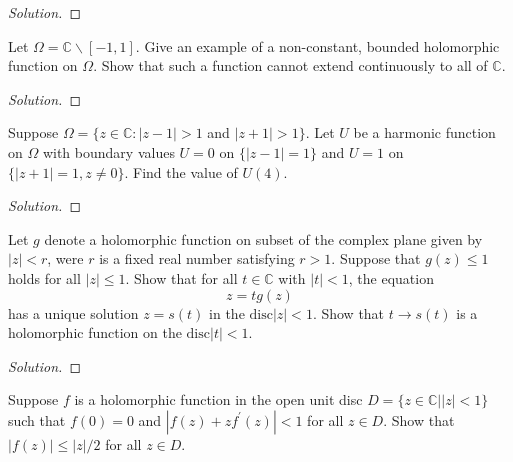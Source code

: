 \documentclass[10pt]{article}
\newenvironment{soln}{\begin{proof}[Solution]}{\end{proof}}
\begin{document}
\begin{soln}

\end{soln}



\begin{problem}
[2005 A-II-1]
Let $\Omega=\mathbb{C} \backslash[-1,1]$. Give an example of a non-constant, bounded holomorphic function on $\Omega$. Show that such a function cannot extend continuously to all of $\mathbb{C}$.
\end{problem}

\begin{soln}

\end{soln}



\begin{problem}
[2004 J-I-3]
Suppose $\Omega=\{z \in \mathbb{C}:|z-1|>1$ and $|z+1|>1\}$. Let $U$ be a harmonic function on $\Omega$ with boundary values $U=0$ on $\{|z-1|=1\}$ and $U=1$ on $\{|z+1|=1, z \neq 0\}$. Find the value of $U(4)$.
\end{problem}

\begin{soln}

\end{soln}



\begin{problem}
[2004 J-I-6]
Let $g$ denote a holomorphic function on subset of the complex plane given by $|z|< r$, were $r$ is a fixed real number satisfying $r >1$. Suppose that $g(z) \leq 1$ holds for all $|z| \leq 1$. Show that for all $t \in \mathbb{C}$ with $|t|< 1$, the equation
$$
z=t g(z)
$$
has a unique solution $z=s(t)$ in the $\text{disc}|z|< 1$. Show that $t \rightarrow s(t)$ is a holomorphic function on the $\text{disc}|t|< 1$.
\end{problem}

\begin{soln}

\end{soln}



\begin{problem}
[2004 A-I-3]
Suppose $f$ is a holomorphic function in the open unit disc
$D=\{z \in \mathbb{C}|| z \mid<1\}$ such that $f(0)=0$ and $\left|f(z)+z f^{\prime}(z)\right|<1$ for all $z \in D$. Show that $|f(z)| \leq|z| / 2$ for all $z \in D$.
\end{problem}
\end{document}
